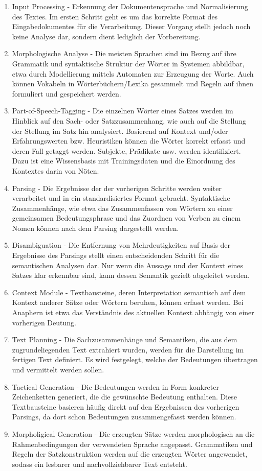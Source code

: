 \documentclass[12pt]{article}
\begin{document}
\begin{enumerate}
\item
Input Processing - Erkennung der Dokumentensprache und Normalisierung des Textes. Im ersten Schritt geht es um das korrekte Format des Eingabedokumentes für die Verarbeitung. Dieser Vorgang stellt jedoch noch keine Analyse dar, sondern dient lediglich der Vorbereitung.
\item
Morphologische Analyse - Die meisten Sprachen sind im Bezug auf ihre Grammatik und syntaktische Struktur der Wörter in Systemen abbildbar, etwa durch Modellierung mittels Automaten zur Erzeugung der Worte. Auch können Vokabeln in Wörterbüchern/Lexika gesammelt und Regeln auf ihnen formuliert und gespeichert werden.
\item
Part-of-Speech-Tagging - Die einzelnen Wörter eines Satzes werden im Hinblick auf den Sach- oder Satzzusammenhang, wie auch auf die Stellung der Stellung im Satz hin analysiert. Basierend auf Kontext und/oder Erfahrungswerten bzw. Heuristiken können die Wörter korrekt erfasst und deren Fall getaggt werden. Subjekte, Prädikate usw. werden identifiziert. Dazu ist eine Wissensbasis mit Trainingsdaten und die Einordnung des Kontextes darin von Nöten.
\item
Parsing - Die Ergebnisse der  der vorherigen Schritte werden weiter verarbeitet und in ein standardisiertes Format gebracht. Syntaktische Zusammenhänge, wie etwa das Zusammenfassen von Wörtern zu einer gemeinsamen Bedeutungsphrase und das Zuordnen von Verben zu einem Nomen können nach dem Parsing dargestellt werden.
\item
Disambiguation - Die Entfernung von Mehrdeutigkeiten auf Basis der Ergebnisse des Parsings stellt einen entscheidenden Schritt für die semantischen Analysen dar. Nur wenn die Aussage und der Kontext eines Satzes klar erkennbar sind, kann dessen Semantik gezielt abgeleitet werden.
\item
Context Module - Textbausteine, deren Interpretation semantisch auf dem Kontext anderer Sätze oder Wörtern beruhen, können erfasst werden. Bei Anaphern ist etwa das Verständnis des aktuellen Kontext abhängig von einer vorherigen Deutung.
\item
Text Planning - Die Sachzusammenhänge und Semantiken, die aus dem zugrundeliegenden Text extrahiert wurden, werden für die Darstellung im fertigen Text definiert. Es wird festgelegt, welche der Bedeutungen übertragen und vermittelt werden sollen.
\item
Tactical Generation - Die Bedeutungen werden in Form konkreter Zeichenketten generiert, die die gewünschte Bedeutung enthalten. Diese Textbausteine basieren häufig direkt auf den Ergebnissen des vorherigen Parsings, da dort schon Bedeutungen zusammengefasst werden können.
\item
Morpholigical Generation - Die erzeugten Sätze werden morphologisch an die Rahmenbedingungen der verwendeten Sprache angepasst. Grammatiken und Regeln der Satzkonstruktion werden auf die erzeugten Wörter angewendet, sodass ein lesbarer und nachvollziehbarer Text entsteht.
\end{enumerate}
\end{document}
